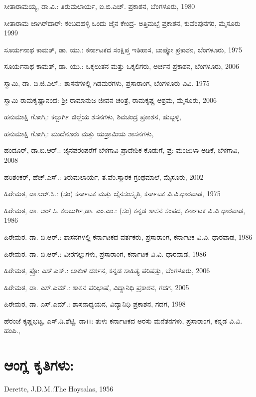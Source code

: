 \noindent
ಸೀತಾರಾಮಯ್ಯ, ಡಾ.ವಿ.: ತಿರುಮಲಾರ್ಯ, ಐ.ಬಿ.ಎಚ್​. ಪ್ರಕಾಶನ, ಬೆಂಗಳೂರು, 1980

\noindent
ಸೀತಾರಾಮ ಜಾಗಿರ್​ದಾರ್​: ಕಂಬದಹಳ್ಳಿ ಒಂದು ಜೈನ ಕೇಂದ್ರ- ಅತ್ತಿಮಬ್ಬೆ ಪ್ರಕಾಶನ, ಕುವೆಂಪುನಗರ, ಮೈಸೂರು 1999

\noindent
ಸೂರ್ಯನಾಥ ಕಾಮತ್​, ಡಾ. ಯು.: ಕರ್ನಾಟಕದ ಸಂಕ್ಷಿಪ್ತ ಇತಿಹಾಸ, ಬಾಪ್ಕೋ ಪ್ರಕಾಶನ, ಬೆಂಗಳೂರು, 1975

\noindent
ಸೂರ್ಯನಾಥ ಕಾಮತ್​, ಡಾ. ಯು.: ಒಕ್ಕಲುತನ ಮತ್ತು ಒಕ್ಕಲಿಗರು, ಅರ್ಚನ ಪ್ರಕಾಶನ, ಬೆಂಗಳೂರು, 2006

\noindent
ಸ್ವಾಮಿ, ಡಾ. ಬಿ.ಜಿ.ಎಲ್​.: ಶಾಸನಗಳಲ್ಲಿ ಗಿಡಮರಗಳು, ಪ್ರಸಾರಾಂಗ, ಬೆಂಗಳೂರು ವಿವಿ. 1975

\noindent
ಸ್ವಾಮಿ ರಾಮಕೃಷ್ಣಾನಂದ: ಶ‍್ರೀ ರಾಮಾನುಜ ಜೀವನ ಚರಿತ್ರೆ, ರಾಮಕೃಷ್ಣ ಆಶ್ರಮ, ಮೈಸೂರು, 2006

\noindent
ಹನುಮಾಕ್ಷಿ ಗೋಗಿ,: ಕಲ್ಬುರ್ಗಿ ಜಿಲ್ಲೆಯ ಶಸನಗಳು, ಶಿವಚಂದ್ರ ಪ್ರಕಾಶನ, ಹುಬ್ಬಳ್ಳಿ,

\noindent
ಹನುಮಾಕ್ಷಿ ಗೋಗಿ,: ಮುದೆನೂರು ಮತ್ತು ಯಡ್ರಾಮಿಯ ಶಾಸನಗಳು,

\noindent
ಹಂದೂರ್​, ಡಾ.ಬಿ.ಆರ್​.: ಜೈನಪರಂಪರೆಗೆ ಬೆಳಗಾವಿ ಪ್ರಾದೇಶಿಕ ಕೊಡುಗೆ, ಪ್ರ: ಮಂಜುಳಾ ಅಡಿಕೆ, ಬೆಳಗಾವಿ, 2008

\noindent
ಹರಿಶಂಕರ್​, ಹೆಚ್​.ಎಸ್​.: ತಿರುಮಲಾರ್ಯ, ತ.ವೆಂ.ಸ್ಮಾರಕ ಗ್ರಂಥಮಾಲೆ, ಮೈಸೂರು, 2002

\noindent
ಹಿರೇಮಠ, ಡಾ.ಆರ್​.ಸಿ.: (ಸಂ) ಕರ್ನಾಟಕ ಮತ್ತು ಜೈನಸಂಸ್ಕೃತಿ, ಕರ್ನಾಟಕ ವಿ.ವಿ.ಧಾರವಾಡ, 1975

\noindent
ಹಿರೇಮಠ, ಡಾ. ಆರ್​.ಸಿ. ಕಲಬುರ್ಗಿ,ಡಾ. ಎಂ.ಎಂ.: (ಸಂ) ಕನ್ನಡ ಶಾಸನ ಸಂಪದ, ಕರ್ನಾಟಕ ವಿ.ವಿ ಧಾರವಾಡ, 1986

\noindent
ಹಿರೇಮಠ. ಡಾ. ಬಿ.ಆರ್​.: ಶಾಸನಗಳಲ್ಲಿ ಕರ್ನಾಟಕದ ವರ್ತಕರು, ಪ್ರಸಾರಾಂಗ, ಕರ್ನಾಟಕ ವಿ.ವಿ. ಧಾರವಾಡ, 1986

\noindent
ಹಿರೇಮಠ. ಡಾ. ಬಿ.ಆರ್​.: ವೀರಗಲ್ಲುಗಳು, ಪ್ರಸಾರಾಂಗ, ಕರ್ನಾಟಕ ವಿ.ವಿ. ಧಾರವಾಡ, 1986

\noindent
ಹಿರೇಮಠ, ಪ್ರೊ: ಎಸ್​.ಎಸ್​.: ಲಾಕುಳ ದರ್ಶನ, ಕನ್ನಡ ಸಾಹಿತ್ಯ ಪರಿಷತ್ತು, ಬೆಂಗಳೂರು, 2006

\noindent
ಹಿರೇಮಠ, ಡಾ. ಎಸ್​.ಎಮ್.: ಶಾಸನ ಪರಿಭಾಷೆ, ವಿದ್ಯಾನಿಧಿ ಪ್ರಕಾಶನ, ಗದಗ, 2005

\noindent
ಹಿರೇಮಠ, ಡಾ. ಎಸ್​.ಎಮ್.: ಶಾಸನಾಧ್ಯಯನ, ವಿದ್ಯಾನಿಧಿ ಪ್ರಕಾಶನ, ಗದಗ, 1998

\noindent
ಹೆರಂಜೆ ಕೃಷ್ಣಭಟ್ಟ, ಎಸ್​.ಡಿ.ಶೆಟ್ಟಿ, ಡಾ।।: ತುಳು ಕರ್ನಾಟಕದ ಅರಸು ಮನೆತನಗಳು, ಪ್ರಸಾರಾಂಗ, ಕನ್ನಡ ವಿ.ವಿ. ಹಂಪಿ.,


\section{ಆಂಗ್ಲ ಕೃತಿಗಳು:}

\noindent
Derette, J.D.M.:The Hoysalas, 1956

